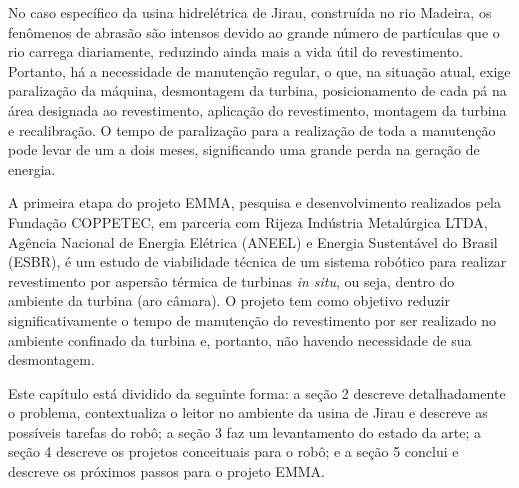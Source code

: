 No caso específico da usina hidrelétrica de Jirau, construída no rio Madeira,
os fenômenos de abrasão são intensos devido ao grande número
de partículas que o rio carrega diariamente, reduzindo ainda mais a vida útil do
revestimento.
Portanto, há a necessidade de manutenção regular, o que, na situação atual,
exige paralização da máquina, desmontagem da turbina, posicionamento de cada pá
na área designada ao revestimento, aplicação do revestimento, montagem da
turbina e recalibração. O tempo de paralização para a realização de
toda a manutenção pode levar de um a dois meses, significando uma grande perda
na geração de energia. 

A primeira etapa do projeto EMMA, pesquisa e desenvolvimento
realizados pela Fundação COPPETEC, em parceria com Rijeza Indústria Metalúrgica LTDA, 
Agência Nacional de Energia Elétrica (ANEEL) e
Energia Sustentável do Brasil (ESBR), é um estudo de viabilidade técnica 
de um sistema robótico para realizar
revestimento por aspersão térmica de turbinas \textit{in situ}, ou seja, dentro
do ambiente da turbina (aro câmara). O projeto tem como objetivo reduzir
significativamente o tempo de manutenção do revestimento por ser realizado no
ambiente confinado da turbina e, portanto, não havendo necessidade de sua
desmontagem.

Este capítulo está dividido da seguinte forma: a seção 2 descreve
detalhadamente o problema, contextualiza o leitor no ambiente da usina de
Jirau e descreve as possíveis tarefas do robô; a seção 3 faz um levantamento do
estado da arte; a seção 4 descreve os projetos conceituais para o robô; e a
seção 5 conclui e descreve os próximos passos para o projeto EMMA. 



